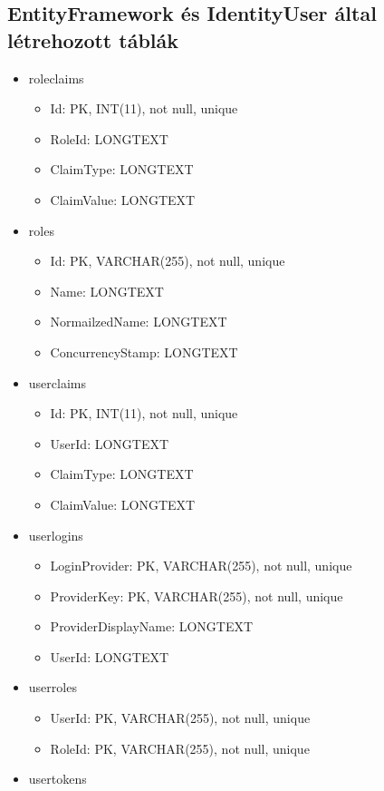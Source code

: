 \documentclass[11pt]{article}
\begin{document}
\subsection{EntityFramework és IdentityUser által létrehozott táblák}
\label{sec:org3f04ddd}
\begin{itemize}
\item roleclaims
\begin{itemize}
\item Id:  PK, INT(11), not null, unique
\item RoleId: LONGTEXT
\item ClaimType: LONGTEXT
\item ClaimValue: LONGTEXT
\end{itemize}
\item roles
\begin{itemize}
\item Id: PK, VARCHAR(255), not null, unique
\item Name: LONGTEXT
\item NormailzedName: LONGTEXT
\item ConcurrencyStamp: LONGTEXT
\end{itemize}
\item userclaims
\begin{itemize}
\item Id:  PK, INT(11), not null, unique
\item UserId: LONGTEXT
\item ClaimType: LONGTEXT
\item ClaimValue: LONGTEXT
\end{itemize}
\item userlogins
\begin{itemize}
\item LoginProvider: PK, VARCHAR(255), not null, unique
\item ProviderKey: PK, VARCHAR(255), not null, unique
\item ProviderDisplayName: LONGTEXT
\item UserId: LONGTEXT
\end{itemize}
\item userroles
\begin{itemize}
\item UserId: PK, VARCHAR(255), not null, unique
\item RoleId: PK, VARCHAR(255), not null, unique
\end{itemize}
\item usertokens
\begin{itemize}

\end{itemize}
\end{itemize}
\end{document}
